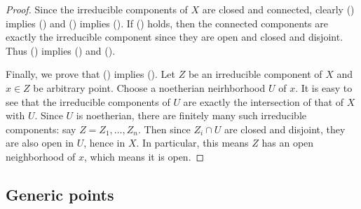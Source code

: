 \begin{proof}
Since the irreducible components of $X$ are closed and connected, clearly () implies () and () implies (). If () holds, then the connected components are exactly the irreducible component since they are open and closed and disjoint. Thus () implies () and ().\par
Finally, we prove that () implies (). Let $Z$ be an irreducible component of $X$ and $x\in Z$ be arbitrary point. Choose a noetherian neirhborhood $U$ of $x$. It is easy to see that the irreducible components of $U$ are exactly the intersection of that of $X$ with $U$. Since $U$ is noetherian, there are finitely many such irreducible components: say $Z=Z_1,\dots,Z_n$. Then since $Z_i\cap U$ are closed and disjoint, they are also open in $U$, hence in $X$. In particular, this means $Z$ has an open neighborhood of $x$, which means it is open.
\end{proof}
\subsection{Generic points}
